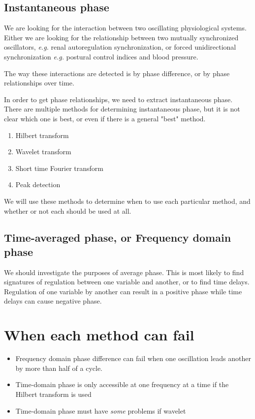 \documentclass{article}
\begin{document}
\subsection*{Instantaneous phase}
We are looking for the interaction between two oscillating physiological systems. Either we are looking for the relationship between two mutually synchronized oscillators, \textit{e.g.} renal autoregulation synchronization, or forced unidirectional synchronization \textit{e.g.} postural control indices and blood pressure. 

The way these interactions are detected is by phase difference, or by phase relationships over time. 

In order to get phase relationships, we need to extract instantaneous phase. There are multiple methods for determining instantaneous phase, but it is not clear which one is best, or even if there is a general "best" method.
\begin{enumerate}
\item Hilbert transform
\item Wavelet transform
\item Short time Fourier transform
\item Peak detection
\end{enumerate}

We will use these methods to determine when to use each particular method, and whether or not each should be used at all.

\subsection*{Time-averaged phase, or Frequency domain phase}

We should investigate the purposes of average phase. This is most likely to find signatures of regulation between one variable and another, or to find time delays. Regulation of one variable by another can result in a positive phase while time delays can cause negative phase.

\section*{When each method can fail}
\begin{itemize}
\item Frequency domain phase difference can fail when one oscillation leads another by more than half of a cycle.
\item Time-domain phase is only accessible at one frequency at a time if the Hilbert transform is used
\item Time-domain phase must have \textit{some} problems if wavelet 
\end{itemize}
\end{document}
